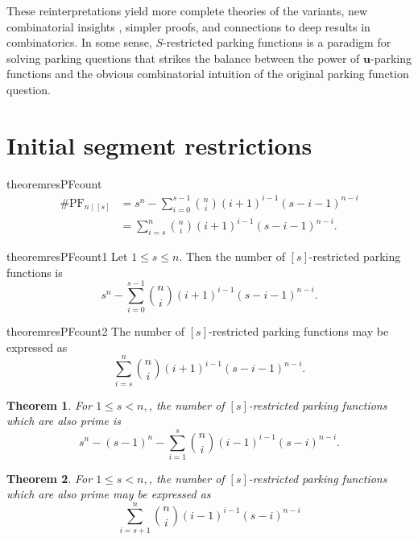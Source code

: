 \documentclass[12 pt]{amsart}
\newtheorem{theorem}{Theorem}[section]
\theoremstyle{definition} %
\theoremstyle{remark} %
\begin{document}
These reinterpretations yield more complete theories of the variants, new combinatorial insights , simpler proofs, and connections to deep results in combinatorics. In some sense, $S$-restricted parking functions is a paradigm for solving parking questions that strikes the balance between the power of $\mathbf{u}$-parking functions and the obvious combinatorial intuition of the original parking function question.

\section{Initial segment restrictions}

\begin{restatable}{theorem}{resPFcount}
	\label{thm:resPFcount}
	\[
		\begin{split}
			\# \mathrm{PF}_{n \mid [s]} & = s^{n} - \sum_{i = 0}^{s - 1} \binom{n}{i} (i + 1)^{i - 1} (s - i - 1)^{n - i} \\
				    & = \sum_{i = s}^{n} \binom{n}{i} (i + 1)^{i - 1} (s - i - 1)^{n - i}.
		\end{split}
	\]
\end{restatable}

\begin{restatable}{theorem}{resPFcount1}
    \label{thm:resPFcount1}
    Let $1\le s\le n.$ Then the number of $[s]$-restricted parking functions is
    \[s^{n} - \sum_{i = 0}^{s - 1} \binom{n}{i} (i + 1)^{i - 1} (s - i - 1)^{n - i}.\]
\end{restatable}

\begin{restatable}{theorem}{resPFcount2}
    \label{thm:resPFcount2}
    The number of $[s]$-restricted parking functions may be expressed as
    \[\sum_{i = s}^{n} \binom{n}{i} (i + 1)^{i - 1} (s - i - 1)^{n - i}.\]
\end{restatable}

\begin{theorem}
    \label{thm:resPPFcount1}
    For $1 \le s < n,$, the number of $[s]$-restricted parking functions which are also prime is 
    \[s^{n} - (s - 1)^{n} - \sum_{i = 1}^{s} \binom{n}{i} (i - 1)^{i - 1} (s - i)^{n - i}.\]
\end{theorem}

\begin{theorem}
    \label{thm:resPPFcount2}
    For $1 \le s < n,$, the number of $[s]$-restricted parking functions which are also prime may be expressed as
    \[\sum_{i = s + 1}^{n} \binom{n}{i} (i - 1)^{i - 1} (s - i)^{n - i}\]
\end{theorem}
\end{document}
